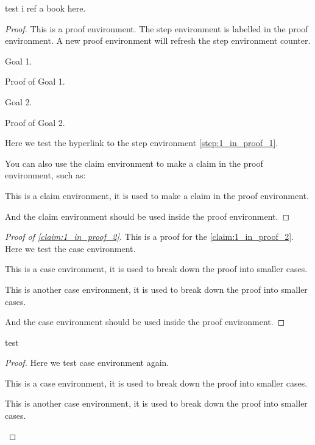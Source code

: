     \begin{theorem}
        test i ref a book \cite{FGA05} here.
    \end{theorem}
    \begin{proof}
        This is a proof environment.
        The step environment is labelled in the proof environment.
        A new proof environment will refresh the step environment counter.
        \begin{step}\label{step:1_in_proof_2}
            Goal 1.
        \end{step}
        Proof of Goal 1.
        
        \begin{step}\label{step:2_in_proof_2}
            Goal 2.
        \end{step}
        Proof of Goal 2.

        Here we test the hyperlink to the step environment \cref{step:1_in_proof_1}.

        You can also use the claim environment to make a claim in the proof environment, such as:
        \begin{claim}\label{claim:1_in_proof_2}
            This is a claim environment, it is used to make a claim in the proof environment.
        \end{claim}
        And the claim environment should be used inside the proof environment.
    \end{proof}
    \begin{proof}[Proof of \cref{claim:1_in_proof_2}]
        This is a proof for the \cref{claim:1_in_proof_2}.
        Here we test the case environment.
        \begin{case}\label{case:1_in_proof_2}
            This is a case environment, it is used to break down the proof into smaller cases.
        \end{case}
        \begin{case}\label{case:2_in_proof_2}
            This is another case environment, it is used to break down the proof into smaller cases.
        \end{case}
        And the case environment should be used inside the proof environment.
    \end{proof}

    \begin{lemma}
        test
    \end{lemma}
    \begin{proof}
        Here we test case environment again.
        \begin{case}\label{case:1_in_proof_3} 
            This is a case environment, it is used to break down the proof into smaller cases.
        \end{case}
        \begin{case}\label{case:2_in_proof_3}
            This is another case environment, it is used to break down the proof into smaller cases.
        \end{case}
    \end{proof}

